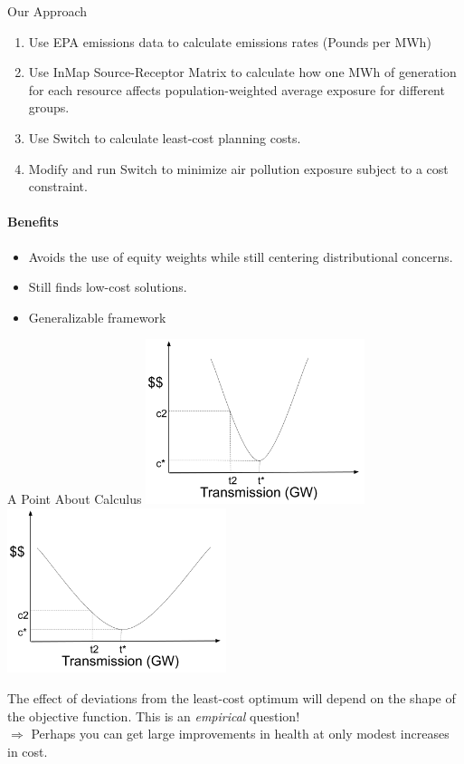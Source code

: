 \documentclass{beamer}
\begin{document}
\begin{frame}{Our Approach}
    \begin{enumerate}
        \item Use EPA emissions data to calculate emissions rates (Pounds per MWh)
        \item Use InMap Source-Receptor Matrix to calculate how one MWh of generation for each resource affects population-weighted average exposure for different groups.
        \item Use Switch to calculate least-cost planning costs.
        \item Modify and run Switch to minimize air pollution exposure subject to a cost constraint.
    \end{enumerate}

\paragraph{Benefits}
\begin{itemize}
    \item Avoids the use of equity weights while still centering distributional concerns.
    \item Still finds low-cost solutions.
    \item Generalizable framework
\end{itemize}
\end{frame}

\begin{frame}{A Point About Calculus}
    \includegraphics[width=0.48\textwidth]{Figures/Slide Pictures/Transmission1.png} \includegraphics[width=0.48\textwidth]{Figures/Slide Pictures/Transmission2.png}

    The effect of deviations from the least-cost optimum will depend on the shape of the objective function.  This is an \textit{empirical} question!\\
    \vspace{.5cm}
    $\Rightarrow$ Perhaps you can get large improvements in health at only modest increases in cost.
\end{frame}
\end{document}
